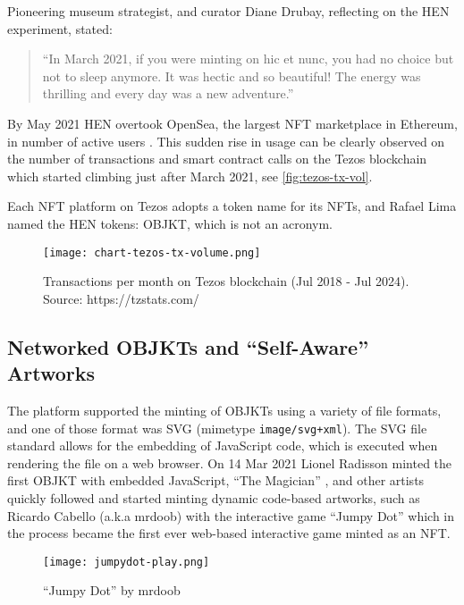 Pioneering museum strategist, and curator Diane Drubay, reflecting on the HEN experiment, stated:

\begin{quotation}
``In March 2021, if you were minting on hic et nunc, you had no choice but not to sleep anymore. It was hectic and so beautiful! The energy was thrilling and every day was a new adventure.'' \cite{drubayHowHicNunc2021}
\end{quotation}



By May 2021 HEN overtook OpenSea, the largest NFT marketplace in Ethereum, in number of active users \cite{nelsonWhereAreYour2022}. This sudden rise in usage can be clearly observed on the number of transactions and smart contract calls on the Tezos blockchain which started climbing just after March 2021, see \autoref{fig:tezos-tx-vol}.

Each NFT platform on Tezos adopts a token name for its NFTs, and Rafael Lima named the HEN tokens: \gls{OBJKT}, which is not an acronym.


\begin{figure}[h]
    \centering
    \texttt{[image: chart-tezos-tx-volume.png]}
    \caption[Transactions per month on Tezos blockchain]{Transactions per month on Tezos blockchain (Jul 2018 - Jul 2024). Source: https://tzstats.com/}
    \label{fig:tezos-tx-vol}
\end{figure}


\subsection{Networked OBJKTs and ``Self-Aware'' Artworks}

The platform supported the minting of OBJKTs using a variety of file formats, and one of those format was SVG (mimetype \texttt{image/svg+xml}). The SVG file standard allows for the embedding of JavaScript code, which is executed when rendering the file on a web browser.  On 14 Mar 2021 Lionel Radisson minted the first OBJKT with embedded JavaScript, ``The Magician''  \cite{makio135Magician2021}, and other artists quickly followed and started minting dynamic code-based artworks, such as Ricardo Cabello (a.k.a mrdoob)  with the interactive game ``Jumpy Dot'' \needcite which in the process became the first ever web-based interactive game minted as an NFT.

\begin{figure}[H]
    \centering
    \texttt{[image: jumpydot-play.png]}
    \caption[``Jumpy Dot'' by mrdoob]{``Jumpy Dot'' by mrdoob}
    \label{fig:jumpydot}
\end{figure}


